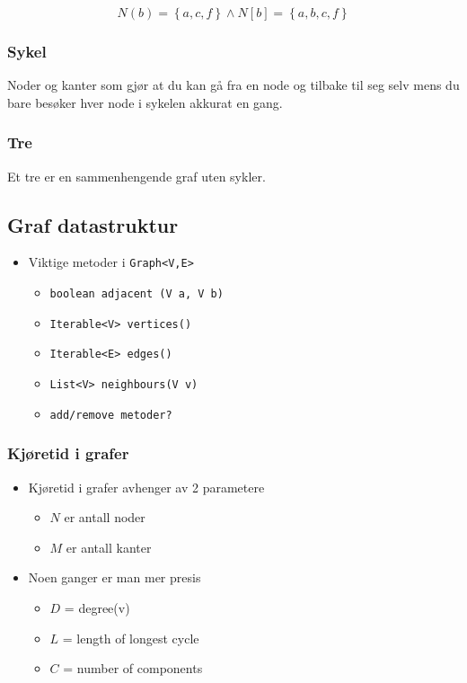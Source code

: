 \documentclass{article}
\begin{document}
    \[ N\left( b \right)=\left\{ a,c,f \right\} \wedge N\left[ b \right] = \left\{ a,b,c,f \right\}\]

    \subsubsection{Sykel}
    Noder og kanter som gjør at du kan gå fra en node og tilbake til seg selv mens du bare besøker hver node i sykelen akkurat en gang.

    \subsubsection{Tre}
    Et tre er en sammenhengende graf uten sykler.


    \subsection{Graf datastruktur}
    \begin{itemize}
        \item Viktige metoder i \texttt{Graph<V,E>}
            \begin{itemize}
                \item \texttt{boolean adjacent (V a, V b)}
                \item \texttt{Iterable<V> vertices()}
                \item \texttt{Iterable<E> edges()}
                \item \texttt{List<V> neighbours(V v)}
                \item \texttt{add/remove metoder?}
            \end{itemize}
    \end{itemize}

    \subsubsection{Kjøretid i grafer}
    \begin{itemize}
        \item Kjøretid i grafer avhenger av 2 parametere
            \begin{itemize}
                \item \( N \) er antall noder
                \item \( M \) er antall kanter
            \end{itemize}
        \item Noen ganger er man mer presis
            \begin{itemize}
                \item \( D \) = degree(v)
                \item \( L \) = length of longest cycle
                \item \( C \) = number of components
            \end{itemize}
    \end{itemize}
\end{document}
